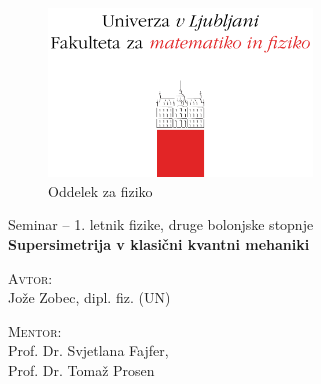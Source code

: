 \begin{titlepage}
	\begin{figure}[H]
		\centering
		\includegraphics[width = 7cm, keepaspectratio=1]{pics/logo.pdf}\\[12pt]
		{\sc Oddelek za fiziko}\\[4cm]
	\end{figure}
	\begin{center}
		\large{Seminar -- 1. letnik fizike, druge bolonjske stopnje}\\[0.5cm]
		\LARGE\textbf{Supersimetrija v klasi\v cni kvantni mehaniki}\\[1.0cm]

		\vspace{0.0cm}

		\begin{minipage}{0.4\textwidth}\small
			\begin{flushleft}
			\textsc{Avtor:}\\[0.2cm]
			Jo\v ze Zobec, dipl. fiz. (UN)
			\end{flushleft}
		\end{minipage}
		\begin{minipage}{0.4\textwidth}\small
			\begin{flushright}
				\textsc{Mentor:}\\[0.2cm]
				Prof. Dr. Svjetlana Fajfer,\\[0.1cm]
				Prof. Dr. Toma\v z Prosen
			\end{flushright}
		\end{minipage}
	\end{center}

	\vspace{5.0cm}

	\begin{abstract}
		Supersimetrija ni ve\v c tako vro\v ce podro\v cje, kot je bilo pred leti. To je predvsem
		zaradi meritev v fiziki delcev, ki zaenkrat nakazujejo, da je ni v na\v sem energijskem
		dosegu. Vendar pa je supersimetrija \v sir\v se podro\v cje, ki ni omejeno zgolj na fiziko
		delcev. V tem seminarju bom pokazal napredne ra\v cunske prijeme v obravnavi klasi\v cnih
		kvantno-mehanskih problemih.
	\end{abstract}
	
	\vfill

\end{titlepage}


